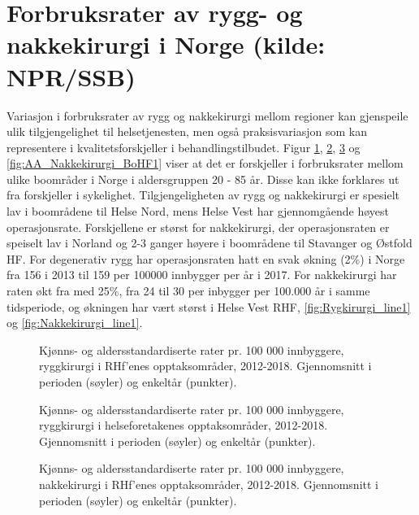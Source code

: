 \documentclass [norsk,a4paper,twoside]{article}\usepackage[]{graphicx}\usepackage[]{color}
\begin{document}
\section{Forbruksrater av rygg- og nakkekirurgi i Norge (kilde: NPR/SSB)}
Variasjon i forbruksrater av rygg og nakkekirurgi mellom regioner kan 
gjenspeile ulik tilgjengelighet til helsetjenesten, men også praksisvariasjon som kan
representere i kvalitetsforskjeller i behandlingstilbudet. Figur \ref{fig:AA_Ryggkirurgi_BoRHF1}, \ref{fig:AA_Ryggkirurgi_BoHF1}, \ref{fig:AA_Nakkekirurgi_BoRHF1} og \ref{fig:AA_Nakkekirurgi_BoHF1} viser at det
er forskjeller i forbruksrater mellom ulike boområder i Norge i aldersgruppen 20 - 85 år. Disse kan ikke
forklares ut fra forskjeller i sykelighet. Tilgjengeligheten av rygg og nakkekirurgi er spesielt lav i boområdene til
Helse Nord, mens Helse Vest har gjennomgående høyest operasjonsrate. Forskjellene er størst for nakkekirurgi, der operasjonsraten er speiselt lav i Norland og 2-3 ganger høyere i boområdene til Stavanger og Østfold HF.
For degenerativ rygg har operasjonsraten hatt en svak økning (2\%) i Norge fra 156 i 2013  til 159 per 100000 innbygger per år i 2017. For nakkekirurgi har raten økt fra med 25\%, fra 24 til 30 per inbygger per 100.000 år i samme tidsperiode, og økningen har vært størst i Helse Vest RHF, \ref{fig:Rygkirurgi_line1} og \ref{fig:Nakkekirurgi_line1}.
 
\begin{figure}[ht]
\caption{Kjønns- og aldersstandardiserte rater pr. 100 000 innbyggere, ryggkirurgi i RHf’enes opptaksområder, 2012-2018. Gjennomsnitt i perioden (søyler) og enkeltår (punkter).}
\label{fig:AA_Ryggkirurgi_BoRHF1}
\end{figure}

\begin{figure}[ht]
\caption{Kjønns- og aldersstandardiserte rater pr. 100 000 innbyggere, ryggkirurgi i helseforetakenes opptaksområder, 2012-2018. Gjennomsnitt i perioden (søyler) og enkeltår (punkter).}
\label{fig:AA_Ryggkirurgi_BoHF1}
\end{figure}


\begin{figure}[ht]
\caption{Kjønns- og aldersstandardiserte rater pr. 100 000 innbyggere, nakkekirurgi i RHf’enes opptaksområder, 2012-2018. Gjennomsnitt i perioden (søyler) og enkeltår (punkter).}
\label{fig:AA_Nakkekirurgi_BoRHF1}
\end{figure}
\end{document}
